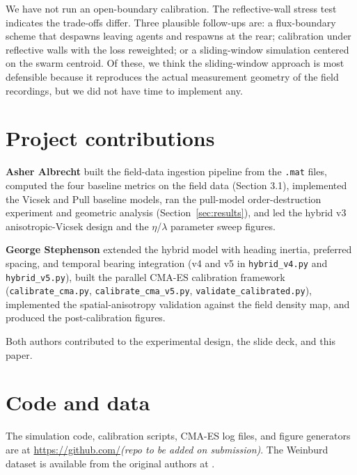 \documentclass[11pt]{article}
\begin{document}
We have not run an open-boundary calibration. The reflective-wall
stress test indicates the trade-offs differ. Three plausible follow-ups
are: a flux-boundary scheme that despawns leaving agents and respawns
at the rear; calibration under reflective walls with the loss
reweighted; or a sliding-window simulation centered on the swarm
centroid. Of these, we think the sliding-window approach is most
defensible because it reproduces the actual measurement geometry of the
\citet{weinburd2024} field recordings, but we did not have time to
implement any.

\section{Project contributions}

\textbf{Asher Albrecht} built the field-data ingestion pipeline from the
\citet{weinburd2024} \texttt{.mat} files, computed the four baseline
metrics on the field data (Section 3.1), implemented the Vicsek and Pull
baseline models, ran the pull-model order-destruction experiment and
geometric analysis (Section~\ref{sec:results}), and led the hybrid v3
anisotropic-Vicsek design and the $\eta$/$\lambda$ parameter sweep
figures.

\textbf{George Stephenson} extended the hybrid model with heading inertia,
preferred spacing, and temporal bearing integration (v4 and v5 in
\texttt{hybrid\_v4.py} and \texttt{hybrid\_v5.py}), built the parallel
CMA-ES calibration framework (\texttt{calibrate\_cma.py},
\texttt{calibrate\_cma\_v5.py}, \texttt{validate\_calibrated.py}),
implemented the spatial-anisotropy validation against the field density
map, and produced the post-calibration figures.

Both authors contributed to the experimental design, the slide deck,
and this paper.

\section*{Code and data}

The simulation code, calibration scripts, CMA-ES log files, and figure
generators are at \url{https://github.com/}\textit{(repo to be added on
submission)}. The Weinburd dataset is available from the original
authors at \citet{weinburd2024}.



\end{document}
